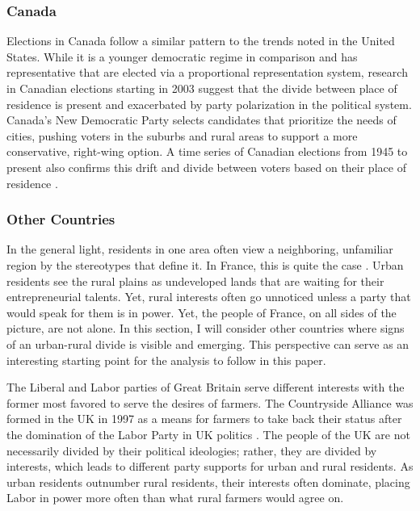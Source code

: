 \documentclass[12pt, titlepage]{article}
\begin{document}
\subsubsection{Canada}

Elections in Canada follow a similar pattern to the trends noted in the United States. While it is a younger democratic regime in comparison and has representative that are elected via a proportional representation system, research in Canadian elections starting in 2003 \citep{walks_place_2004} suggest that the divide between place of residence is present and exacerbated by party polarization in the political system. Canada's New Democratic Party selects candidates that prioritize the needs of cities, pushing voters in the suburbs and rural areas to support a more conservative, right-wing option. A time series of Canadian elections from 1945 to present also confirms this drift and divide between voters based on their place of residence \citep{walks_city-suburban_2005}.

\subsubsection{Other Countries}

In the general light, residents in one area often view a neighboring, unfamiliar region by the stereotypes that define it. In France, this is quite the case \citep{clout_new_2003}. Urban residents see the rural plains as undeveloped lands that are waiting for their entrepreneurial talents. Yet, rural interests often go unnoticed unless a party that would speak for them is in power. Yet, the people of France, on all sides of the picture, are not alone. In this section, I will consider other countries where signs of an urban-rural divide is visible and emerging. This perspective can serve as an interesting starting point for the analysis to follow in this paper.

The Liberal and Labor parties of Great Britain serve different interests with the former most favored to serve the desires of farmers. The Countryside Alliance was formed in the UK in 1997 as a means for farmers to take back their status after the domination of the Labor Party in UK politics \citep{benton_ruralurban_2007}. The people of the UK are not necessarily divided by their political ideologies; rather, they are divided by interests, which leads to different party supports for urban and rural residents. As urban residents outnumber rural residents, their interests often dominate, placing Labor in power more often than what rural farmers would agree on.
\end{document}
